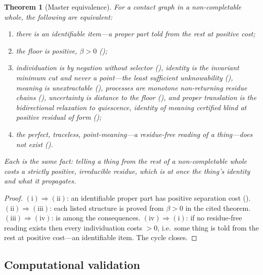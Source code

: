 \documentclass[twocolumn,11pt,a4paper]{article}
\theoremstyle{sup}
\newtheorem{theorem}{Theorem}[section]
\theoremstyle{definition}
\theoremstyle{remark}
\newcommand{\flo}{\beta}
\begin{document}
\begin{theorem}[Master equivalence]
\label{thm:master}
For a contact graph in a non-completable whole, the following are equivalent:
\begin{enumerate}[label=\textup{(\roman*)},leftmargin=2.0em,itemsep=1pt]
\item there is an identifiable item---a proper part told from the rest at
positive cost;
\item the floor is positive, $\flo>0$ ();
\item individuation is by negation without selector (),
identity is the invariant minimum cut and never a point---the least sufficient
unknowability (), meaning is unextractable
(), processes are monotone non-returning residue chains
(), uncertainty is distance to the floor
(), and proper translation is the bidirectional relaxation to
quiescence, identity of meaning certified blind at positive residual of form
();
\item the perfect, traceless, point-meaning---a residue-free reading of a
thing---does not exist ().
\end{enumerate}
Each is the same fact: telling a thing from the rest of a non-completable whole
costs a strictly positive, irreducible residue, which is at once the thing's
identity and what it propagates.
\end{theorem}

\begin{proof}
$(\mathrm{i})\Rightarrow(\mathrm{ii})$: an identifiable proper part has positive
separation cost ().
$(\mathrm{ii})\Rightarrow(\mathrm{iii})$: each listed structure is proved from
$\flo>0$ in the cited theorem.
$(\mathrm{iii})\Rightarrow(\mathrm{iv})$:  is among the
consequences. $(\mathrm{iv})\Rightarrow(\mathrm{i})$: if no residue-free reading
exists then every individuation costs $>0$, i.e.\ some thing is told from the
rest at positive cost---an identifiable item. The cycle closes.
\end{proof}

\subsection{Computational validation}
\end{document}
